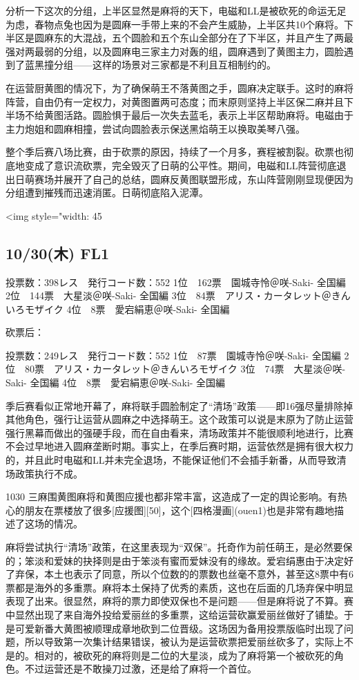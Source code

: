 分析一下这次的分组，上半区显然是麻将的天下，电磁和LL是被砍死的命运无足为虑，春物点兔也因为是圆麻一手带上来的不会产生威胁，上半区共10个麻将。下半区是圆麻东的大混战，五个圆脸和五个东山全部分在了下半区，并且产生了两最强对两最弱的分组，以及圆麻电三家主力对轰的组，圆麻遇到了黄图主力，圆脸遇到了蓝黑撞分组——这样的场景对三家都是不利且互相制约的。

在运营厨黄图的情况下，为了确保萌王不落黄图之手，圆麻决定联手。这时的麻将阵营，自由仍有一定权力，对黄图置两可态度；而末原则坚持上半区保二麻并且下半场不给黄图活路。圆脸惧于最后一次失去蓝毛，表示上半区帮助麻将。电磁由于主力炮姐和圆麻相撞，尝试向圆脸表示保送黑焰萌王以换取美琴八强。

整个季后赛八场比赛，由于砍票的原因，持续了一个月多，赛程被割裂。砍票也彻底地变成了意识流砍票，完全毁灭了日萌的公平性。期间，电磁和LL阵营彻底退出日萌赛场并展开了自己的总结，圆麻反黄图联盟形成，东山阵营刚刚显现便因为分组遭到摧残而迅速消匿。日萌彻底陷入泥潭。

<img style="width: 45%

\subsection{10/30(木) FL1}

	投票数：398レス　発行コード数：552
	1位　162票　園城寺怜＠咲-Saki- 全国編
	2位　144票　大星淡＠咲-Saki- 全国編
	3位　84票　アリス・カータレット＠きんいろモザイク
	4位　8票　愛宕絹恵＠咲-Saki- 全国編

砍票后：

	投票数：249レス　発行コード数：552
	1位　87票　園城寺怜＠咲-Saki- 全国編
	2位　80票　アリス・カータレット＠きんいろモザイク
	3位　74票　大星淡＠咲-Saki- 全国編
	4位　8票　愛宕絹恵＠咲-Saki- 全国編

季后赛看似正常地开幕了，麻将联手圆脸制定了“清场”政策——即16强尽量排除掉其他角色，强行让运营从圆麻之中选择萌王。这个政策可以说是末原为了防止运营强行黑幕而做出的强硬手段，而在自由看来，清场政策并不能很顺利地进行，比赛不会过早地进入圆麻垄断时期。事实上，在季后赛时期，运营依然是拥有很大权力的，并且此时电磁和LL并未完全退场，不能保证他们不会插手新番，从而导致清场政策执行不成。

1030 三麻围黄图麻将和黄图应援也都非常丰富，这造成了一定的舆论影响。有热心的朋友在票楼放了很多[应援图][50]，这个[四格漫画](ouen1)也是非常有趣地描述了这场的情况。

麻将尝试执行“清场”政策，在这里表现为“双保”。托奇作为前任萌王，是必然要保的；笨淡和爱妹的抉择则是由于笨淡有蜜而爱妹没有的缘故。爱宕绢惠由于决定好了弃保，本土也表示了同意，所以个位数的的票数也丝毫不意外，甚至这8票中有6票都是海外的多重票。麻将本土保持了优秀的素质，这也在后面的几场弃保中明显表现了出来。很显然，麻将的票力即使双保也不是问题——但是麻将说了不算。赛中显然出现了来自海外投给爱丽丝的多重票，这给运营砍赢爱丽丝做好了铺垫。于是可爱新番大黄图被顺理成章地砍到二位晋级。这场因为备用投票版临时出现了问题，所以导致第一次集计结果错误，被认为是运营砍票把爱丽丝砍多了，实际上不是的。相对的，被砍死的麻将则是二位的大星淡，成为了麻将第一个被砍死的角色。不过运营还是不敢操刀过激，还是给了麻将一个首位。

